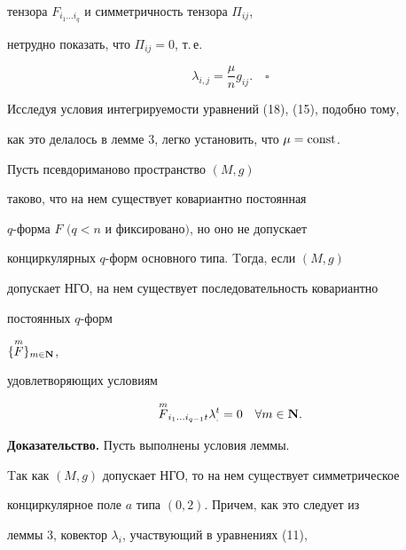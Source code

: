 тензора $F_{i_1\dotsc i_q}$ и симметричность тензора $\Pi_{ij}$,


нетрудно показать, что $\Pi_{ij}=0$, т.\,е.


\begin{equation}


\lambda_{i,j}=\frac {\mu}{n} g_{ij}.\quad\square


\end{equation}





\begin{note}


Исследуя условия интегрируемости уравнений (18), (15), подобно тому,


как это делалось в лемме 3, легко установить, что $\mu=\operatorname{const}$.


\end{note}





\begin{lem}


Пусть псевдориманово пространство $(M, g)$ 


таково, что на нем существует ковариантно постоянная


$q$-форма $F$ $(q<n$ и фиксировано$)$, но оно не допускает 


конциркулярных $q$-форм основного типа. Tогда, если $(M, g)$ 


допускает НГО, на нем существует последовательность ковариантно 


постоянных $q$-форм


$\{\overset{m}{F}\}{}_{m\in\bold N}$, 


удовлетворяющих условиям


$$


\overset{m}{F}{}_{i_1\dotsc i_{q-1}t }\lambda_.^t=0


\quad \forall m\in \bold N.


$$


\end{lem}





{\bf Доказательство.} Пусть выполнены условия леммы. 


Tак как $(M, g)$ допускает НГО, то на нем существует симметрическое 


конциркулярное поле $a$ типа $(0,2)$. Причем, как это следует из


леммы 3, ковектор $\lambda_i$, участвующий в уравнениях (11),


